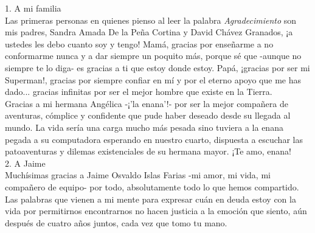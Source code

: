 \documentclass[
12pt, %
spanish, %
singlespacing, %
headsepline, %
]{MastersDoctoralThesis} %
\begin{document}

\begin{acknowledgements}
\addchaptertocentry{\acknowledgementname} %

1. A mi familia\\

Las primeras personas en quienes pienso al leer la palabra \textit{Agradecimiento} son mis padres, Sandra Amada De la Peña Cortina y David Chávez Granados, ¡a ustedes les debo cuanto soy y tengo! Mamá, gracias por enseñarme a no conformarme nunca y a dar siempre un poquito más, porque sé que -aunque no siempre te lo diga- es gracias a ti que estoy donde estoy. Papá, ¡gracias por ser mi Superman!, gracias por siempre confiar en mí y por el eterno apoyo que me has dado... gracias infinitas por ser el mejor hombre que existe en la Tierra.\\

Gracias a mi hermana Angélica -¡'la enana'!- por ser la mejor compañera de aventuras, cómplice y confidente que pude haber deseado desde su llegada al mundo. La vida sería una carga mucho más pesada sino tuviera a la enana pegada a su computadora esperando en nuestro cuarto, dispuesta a escuchar las patoaventuras y dilemas existenciales de su hermana mayor. ¡Te amo, enana!\\


2. A Jaime\\

Muchísimas gracias a Jaime Osvaldo Islas Farias -mi amor, mi vida, mi compañero de equipo- por todo, absolutamente todo lo que hemos compartido. Las palabras que vienen a mi mente para expresar cuán en deuda estoy con la vida por permitirnos encontrarnos no hacen justicia a la emoción que siento, aún después de cuatro años juntos, cada vez que tomo tu mano.\\


\end{acknowledgements}
\end{document}
